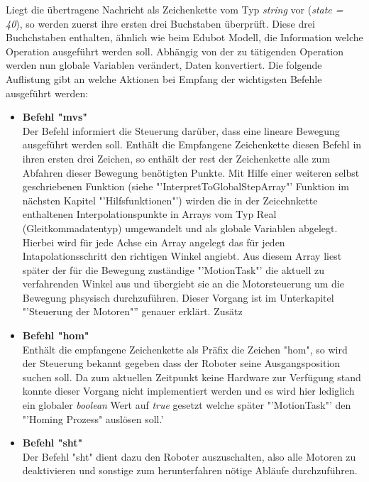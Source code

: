 Liegt die übertragene Nachricht als Zeichenkette vom Typ \textit{string} vor (\textit{state = 40}), so werden zuerst ihre ersten drei Buchstaben überprüft. Diese drei Buchchstaben enthalten, ähnlich wie beim Edubot Modell, die Information welche Operation ausgeführt werden soll. 
Abhängig von der zu tätigenden Operation werden nun globale Variablen verändert, Daten konvertiert. Die folgende Auflistung gibt an welche Aktionen bei Empfang der wichtigsten Befehle ausgeführt werden:

\begin{itemize}
\item \textbf{Befehl "mvs"}\\
Der Befehl informiert die Steuerung darüber, dass eine lineare Bewegung ausgeführt werden soll. Enthält die Empfangene Zeichenkette diesen Befehl in ihren ersten drei Zeichen, so enthält der rest der Zeichenkette alle zum Abfahren dieser Bewegung benötigten Punkte.
Mit Hilfe einer weiteren selbst geschriebenen Funktion (siehe "'InterpretToGlobalStepArray"' Funktion im nächsten Kapitel "'Hilfsfunktionen"') wirden die in der Zeicehnkette enthaltenen Interpolationspunkte in Arrays vom Typ Real (Gleitkommadatentyp) umgewandelt und als globale Variablen abgelegt. Hierbei wird für jede Achse ein Array angelegt das für jeden Intapolationsschritt den richtigen Winkel angiebt. Aus diesem Array liest später der für die Bewegung zuständige "'MotionTask"' die aktuell zu verfahrenden Winkel aus und übergiebt sie an die Motorsteuerung um die Bewegung phsysisch durchzuführen. Dieser Vorgang ist im Unterkapitel "'Steuerung der Motoren"'' genauer erklärt. Zusätz
\item \textbf{Befehl "hom"}\\
Enthält die empfangene Zeichenkette als Präfix die Zeichen "hom", so wird der Steuerung bekannt gegeben dass der Roboter seine Ausgangsposition suchen soll. Da zum aktuellen Zeitpunkt keine Hardware zur Verfügung stand konnte dieser Vorgang nicht implementiert werden und es wird hier lediglich ein globaler \textit{boolean} Wert auf \textit{true} gesetzt welche später "'MotionTask"' den "'Homing Prozess" auslösen soll.'
\item \textbf{Befehl "sht"}\\
Der Befehl "sht" dient dazu den Roboter auszuschalten, also alle Motoren zu deaktivieren und sonstige zum herunterfahren nötige Abläufe durchzuführen. 
\end{itemize}
